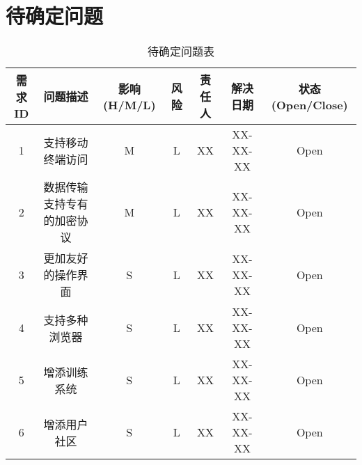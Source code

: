 \chapter{待确定问题}
\begin{table}[htbp]
\centering
\caption{待确定问题表} \label{tab:tbd_problems}
\begin{tabular}{|c|c|c|c|c|c|c|}
    \hline
    需求ID & 问题描述 & 影响(H/M/L) & 风险 & 责任人 & 解决日期 & 状态(Open/Close) \\
    \hline
    1 & 支持移动终端访问 & M & L & XX & XX-XX-XX & Open\\
    \hline
    2 & 数据传输支持专有的加密协议 & M & L & XX & XX-XX-XX & Open\\
    \hline
    3 & 更加友好的操作界面 & S & L & XX & XX-XX-XX & Open\\
    \hline
    4 & 支持多种浏览器 & S & L & XX & XX-XX-XX & Open\\
    \hline
    5 & 增添训练系统 & S & L & XX & XX-XX-XX & Open\\
    \hline
    6 & 增添用户社区 & S & L & XX & XX-XX-XX & Open\\
    \hline
    
    \hline
\end{tabular}
\end{table}